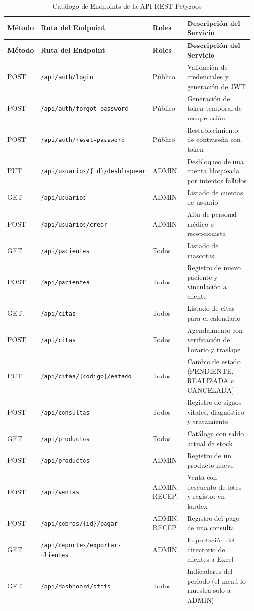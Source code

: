 \documentclass[11pt,a4paper]{report}
\begin{document}
\begin{longtable}{@{}p{1.4cm} p{5.6cm} p{2.6cm} p{5.0cm}@{}}
\caption{Catálogo de Endpoints de la API REST Petyzoos}\label{tab:catalogo_api}\\
\toprule
\textbf{Método} & \textbf{Ruta del Endpoint} & \textbf{Roles} & \textbf{Descripción del Servicio} \\
\midrule
\endfirsthead
\toprule
\textbf{Método} & \textbf{Ruta del Endpoint} & \textbf{Roles} & \textbf{Descripción del Servicio} \\
\midrule
\endhead
\bottomrule
\endfoot
POST & \texttt{/api/auth/login} & Público & Validación de credenciales y generación de JWT \\
POST & \texttt{/api/auth/forgot-password} & Público & Generación de token temporal de recuperación \\
POST & \texttt{/api/auth/reset-password} & Público & Restablecimiento de contraseña con token \\
PUT & \texttt{/api/usuarios/\{id\}/\allowbreak desbloquear} & ADMIN & Desbloqueo de una cuenta bloqueada por intentos fallidos \\
GET & \texttt{/api/usuarios} & ADMIN & Listado de cuentas de usuario \\
POST & \texttt{/api/usuarios/crear} & ADMIN & Alta de personal médico o recepcionista \\
GET & \texttt{/api/pacientes} & Todos & Listado de mascotas \\
POST & \texttt{/api/pacientes} & Todos & Registro de nuevo paciente y vinculación a cliente \\
GET & \texttt{/api/citas} & Todos & Listado de citas para el calendario \\
POST & \texttt{/api/citas} & Todos & Agendamiento con verificación de horario y traslape \\
PUT & \texttt{/api/citas/\{codigo\}/\allowbreak estado} & Todos & Cambio de estado (PENDIENTE, REALIZADA o CANCELADA) \\
POST & \texttt{/api/consultas} & Todos & Registro de signos vitales, diagnóstico y tratamiento \\
GET & \texttt{/api/productos} & Todos & Catálogo con saldo actual de stock \\
POST & \texttt{/api/productos} & ADMIN & Registro de un producto nuevo \\
POST & \texttt{/api/ventas} & ADMIN, RECEP. & Venta con descuento de lotes y registro en kardex \\
POST & \texttt{/api/cobros/\{id\}/pagar} & ADMIN, RECEP. & Registro del pago de una consulta \\
GET & \texttt{/api/reportes/\allowbreak exportar-clientes} & ADMIN & Exportación del directorio de clientes a Excel \\
GET & \texttt{/api/dashboard/stats} & Todos & Indicadores del periodo (el menú lo muestra solo a ADMIN) \\
\end{longtable}
\end{document}
